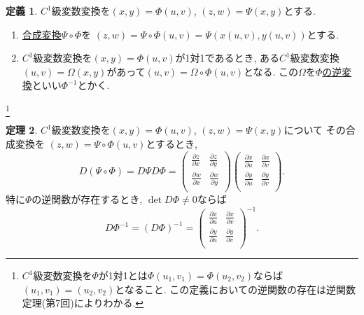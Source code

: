 \documentclass[dvipdfmx,a4paper,11pt]{article}
\theoremstyle{definition}
\newtheorem{thm}{定理}
\newtheorem{dfn}[thm]{定義}
\newcommand{\pdrv}[2]{\frac{\partial #1}{\partial #2}}
\begin{document}
\begin{tcolorbox}[
    colback = white,
    colframe = green!35!black,
    fonttitle = \bfseries,
    breakable = true]
    \begin{dfn}
$C^1$級変数変換を$(x,y) = \Phi (u,v)$, $(z,w) = \Psi (x,y)$とする.

\begin{enumerate}

\item\underline{合成変換$\Psi \circ \Phi$}を
$(z,w) = \Psi \circ \Phi(u,v)=\Psi(x(u,v),y(u,v))$とする.

\item $C^1$級変数変換を$(x,y) = \Phi (u,v)$が1対1であるとき, ある$C^1$級変数変換$(u,v) = \Omega(x,y)$があって$(u,v) = \Omega\circ\Phi (u,v)$となる.
この$\Omega$を\underline{$\Phi $の逆変換}といい$\Phi^{-1}$とかく.
\end{enumerate}
    \end{dfn}
    \end{tcolorbox}
   \footnote{$C^1$級変数変換を$\Phi $が1対1とは$\Phi (u_1,v_1)=\Phi (u_2,v_2)$ならば$(u_1,v_1)=(u_2,v_2)$となること. この定義においての逆関数の存在は逆関数定理(第7回)によりわかる.}   


\begin{tcolorbox}[
    colback = white,
    colframe = green!35!black,
    fonttitle = \bfseries,
    breakable = true]
    \begin{thm}
$C^1$級変数変換を$(x,y) = \Phi (u,v)$, $(z,w) = \Psi (x,y)$について
その合成変換を
$(z,w) = \Psi \circ \Phi(u,v)$とするとき, 
$$
D (\Psi \circ \Phi)
= D \Psi D\Phi
=
\left(\begin{array}{cc} \pdrv{z}{x} & \pdrv{z}{y} \\ \pdrv{w}{x}& \pdrv{w}{y} \\ \end{array} \right)
\left(\begin{array}{cc} \pdrv{x}{u} & \pdrv{x}{v} \\ \pdrv{y}{u}& \pdrv{y}{v} \\ \end{array} \right).
$$
特に$\Phi $の逆関数が存在するとき, $\det D \Phi \neq 0$ならば
$$
D \Phi^{-1}
= (D\Phi)^{-1}
=
\left(\begin{array}{cc} \pdrv{x}{u} & \pdrv{x}{v} \\ \pdrv{y}{u}& \pdrv{y}{v} \\ \end{array} \right)^{-1}.
$$
    \end{thm}
    \end{tcolorbox}
    
\end{document}
